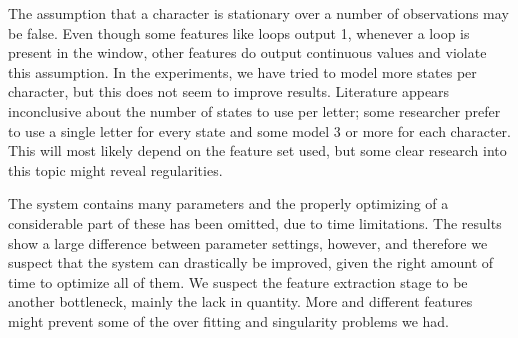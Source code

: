 \documentclass[conference]{IEEEtran}
\begin{document}
The assumption that a character is stationary over a number of observations may be false. Even though some features like loops output 1, whenever a loop is present in the window, other features do output continuous values and violate this assumption. In the experiments, we have tried to model more states per character, but this does not seem to improve results. Literature appears inconclusive about the number of states to use per letter; some researcher prefer to use a single letter for every state and some model 3 or more for each character. This will most likely depend on the feature set used, but some clear research into this topic might reveal regularities.

The system contains many parameters and the properly optimizing of a considerable part of these has been omitted, due to time limitations. The results show a large difference between parameter settings, however, and therefore we suspect that the system can drastically be improved, given the right amount of time to optimize all of them. We suspect the feature extraction stage to be another bottleneck, mainly the lack in quantity. More and different features might prevent some of the over fitting and singularity problems we had.




\end{document}

